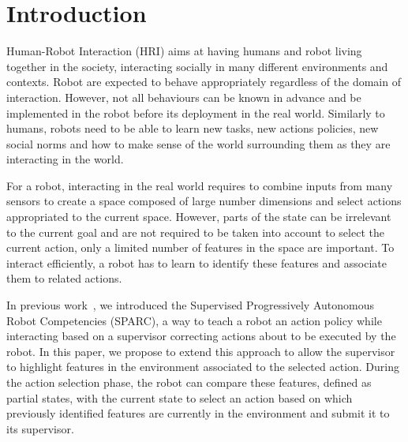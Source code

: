 \documentclass[letterpaper]{article} %
\begin{document}
\section{Introduction}

Human-Robot Interaction (HRI) aims at having humans and robot living together
in the society, interacting socially in many different environments and
contexts. Robot are expected to behave appropriately regardless of the domain
of interaction. However, not all behaviours can be known in advance and be
implemented in the robot before its deployment in the real world. Similarly to
 humans, robots need
to be able to learn new tasks, new actions policies, new social norms and how
to make sense of the world surrounding them as they are interacting in the world.

For a robot, interacting in the real world requires to combine inputs
 from many sensors to create a space composed of large number dimensions and
select actions appropriated to the current space. However,
 parts of the state can be irrelevant to the current goal and are not required
 to be taken into account to select the current action, only a limited number of
 features in the space are important. To interact efficiently, a robot has to
 learn to identify these features and associate them to related actions.


In previous work~\cite{senft2015sparc,senft2017supervised}, we introduced the
Supervised Progressively Autonomous Robot Competencies (SPARC), a way to
teach a robot an action policy while interacting based on a supervisor
correcting actions about to be executed by the robot. In this paper, we propose
to extend this approach to allow the supervisor to highlight features in the
environment associated to the selected action. During the action selection
phase, the robot can compare these features, defined as partial states, with the
current state to select an action based on which previously identified
features are currently in the environment and submit it to its supervisor.
\end{document}
